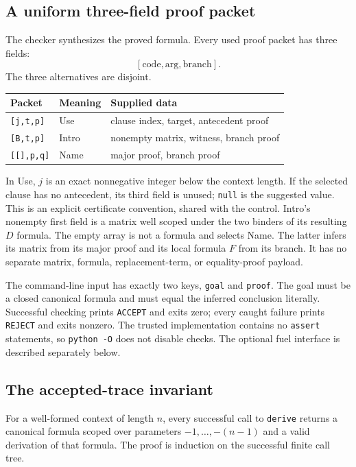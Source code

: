 \subsection{A uniform three-field proof packet}

The checker synthesizes the proved formula. Every used proof packet has
three fields:
\[
                   [\mathrm{code},\mathrm{arg},\mathrm{branch}].
\]
The three alternatives are disjoint.

\begin{center}
\begin{tabular}{@{}lll@{}}
\toprule
Packet & Meaning & Supplied data \\
\midrule
\texttt{[j,t,p]} & Use & clause index, target, antecedent proof \\
\texttt{[B,t,p]} & Intro & nonempty matrix, witness, branch proof \\
\texttt{[[],p,q]} & Name & major proof, branch proof \\
\bottomrule
\end{tabular}
\end{center}

In Use, $j$ is an exact nonnegative integer below the context length.
If the selected clause has no antecedent, its third field is unused;
\texttt{null} is the suggested value. This is an explicit certificate
convention, shared with the control. Intro's nonempty first field is a
matrix well scoped under the two binders of its resulting $D$ formula.
The empty array is not a formula and selects Name. The latter infers its
matrix from its major proof and its local formula $F$ from its branch.
It has no separate matrix, formula, replacement-term, or equality-proof
payload.

The command-line input has exactly two keys, \texttt{goal} and
\texttt{proof}. The goal must be a closed canonical formula and must
equal the inferred conclusion literally. Successful checking prints
\texttt{ACCEPT} and exits zero; every caught failure prints
\texttt{REJECT} and exits nonzero. The trusted implementation contains
no \texttt{assert} statements, so \texttt{python -O} does not disable
checks. The optional fuel interface is described separately below.

\subsection{The accepted-trace invariant}

For a well-formed context of length $n$, every successful call to
\texttt{derive} returns a canonical formula scoped over parameters
$-1,\ldots,-(n-1)$ and a valid derivation of that formula.
The proof is induction on the successful finite call tree.

